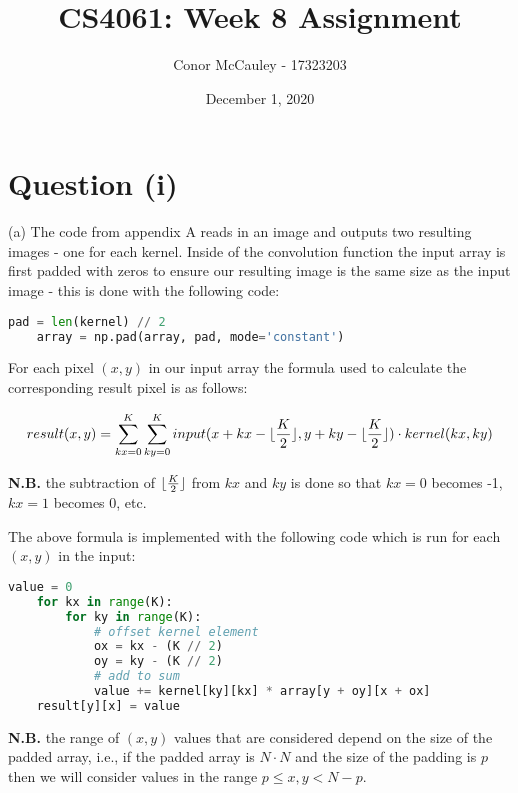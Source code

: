 \documentclass[12pt]{article}
\title{CS4061: Week 8 Assignment}
\author{Conor McCauley - 17323203}
\date{December 1, 2020}
\DeclarePairedDelimiter\floor{\lfloor}{\rfloor}
\begin{document}
\maketitle

\section*{Question (i)}

\noindent (a) The code from appendix A reads in an image and outputs two resulting images - one for each kernel. Inside of the convolution function the input array is first padded with zeros to ensure our resulting image is the same size as the input image - this is done with the following code:

\begin{center}
    \lstset{basicstyle=\footnotesize}
    \begin{lstlisting}[language=Python]
    pad = len(kernel) // 2
    array = np.pad(array, pad, mode='constant')
    \end{lstlisting}
\end{center}

For each pixel $(x, y)$ in our input array the formula used to calculate the corresponding result pixel is as follows:

$$result(x, y) = \sum_{kx = 0}^K \sum_{ky = 0}^K input(x + kx - \floor{\frac{K}{2}}, y + ky - \floor{\frac{K}{2}}) \cdot kernel(kx, ky)$$

\textbf{N.B.} the subtraction of $\floor{\frac{K}{2}}$ from $kx$ and $ky$ is done so that $kx = 0$ becomes -1, $kx = 1$ becomes 0, etc.

The above formula is implemented with the following code which is run for each $(x, y)$ in the input:

\begin{center}
    \lstset{basicstyle=\footnotesize}
    \begin{lstlisting}[language=Python]
    value = 0
    for kx in range(K):
        for ky in range(K):
            # offset kernel element
            ox = kx - (K // 2)
            oy = ky - (K // 2)
            # add to sum
            value += kernel[ky][kx] * array[y + oy][x + ox]
    result[y][x] = value
    \end{lstlisting}
\end{center}

\textbf{N.B.} the range of $(x, y)$ values that are considered depend on the size of the padded array, i.e., if the padded array is $N \cdot N$ and the size of the padding is $p$ then we will consider values in the range $p \le x, y < N - p$.
\end{document}
